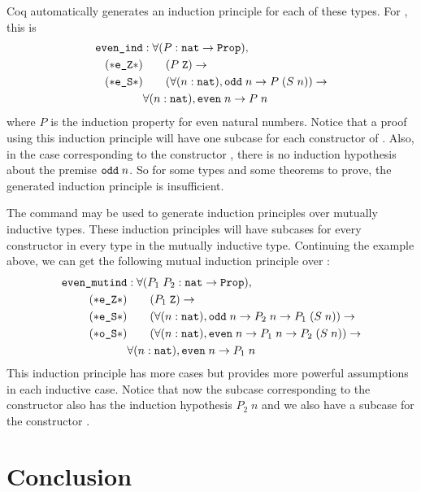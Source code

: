 Coq automatically generates an induction principle for each of these types. For , this is
\begin{align*}
\texttt{even\_ind} &: \forall (P : \texttt{nat} \rightarrow \texttt{Prop}), \\
(*\texttt{e\_Z}*) & \qquad (P \; \texttt{Z}) \rightarrow \\
(*\texttt{e\_S}*) & \qquad (\forall (n : \texttt{nat}), \texttt{odd} \; n \rightarrow P \; (S \; n)) \rightarrow \\
& \forall (n : \texttt{nat}), \texttt{even} \; n \rightarrow P \; n
\end{align*}
where $P$ is the induction property for even natural numbers. Notice that a proof using this induction principle will have one subcase for each constructor of . Also, in the case corresponding to the constructor , there is no induction hypothesis about the premise $\texttt{odd} \; n$. So for some types and some theorems to prove, the generated induction principle is insufficient.

The command  may be used to generate induction principles over mutually inductive types. These induction principles will have subcases for every constructor in every type in the mutually inductive type. Continuing the example above, we can get the following mutual induction principle over :
\begin{align*}
\texttt{even\_mutind} &: \forall (P_1 \; P_2 : \texttt{nat} \rightarrow \texttt{Prop}), \\
(*\texttt{e\_Z}*) & \qquad (P_1 \; \texttt{Z}) \rightarrow \\
(*\texttt{e\_S}*) & \qquad (\forall (n : \texttt{nat}), \texttt{odd} \; n \rightarrow P_2 \; n \rightarrow P_1 \; (S \; n)) \rightarrow \\
(*\texttt{o\_S}*) & \qquad (\forall (n : \texttt{nat}), \texttt{even} \; n \rightarrow P_1 \; n \rightarrow P_2 \; (S \; n)) \rightarrow \\
& \forall (n : \texttt{nat}), \texttt{even} \; n \rightarrow P_1 \; n
\end{align*}
This induction principle has more cases but provides more powerful assumptions in each inductive case. Notice that now the subcase corresponding to the constructor  also has the induction hypothesis $P_2 \; n$ and we also have a subcase for the constructor .


\section{Conclusion}

